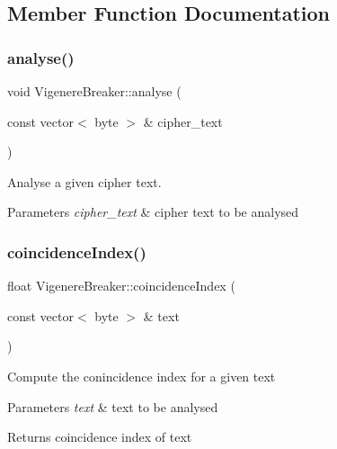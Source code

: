 \subsection{Member Function Documentation}
\mbox{\label{classVigenereBreaker_a6ba37c849739dcda0a06ed0596ae1bf5}} 
\subsubsection{\texorpdfstring{analyse()}{analyse()}}
{\footnotesize\ttfamily void Vigenere\+Breaker\+::analyse (\begin{DoxyParamCaption}\item[{const vector$<$ byte $>$ \&}]{cipher\+\_\+text }\end{DoxyParamCaption})}

Analyse a given cipher text. 
\begin{DoxyParams}{Parameters}
{\em cipher\+\_\+text} & cipher text to be analysed \\
\hline
\end{DoxyParams}
\mbox{\label{classVigenereBreaker_a9f3763cd550c2f97b09dc3c9e872ef4a}} 
\subsubsection{\texorpdfstring{coincidence\+Index()}{coincidenceIndex()}}
{\footnotesize\ttfamily float Vigenere\+Breaker\+::coincidence\+Index (\begin{DoxyParamCaption}\item[{const vector$<$ byte $>$ \&}]{text }\end{DoxyParamCaption})}

Compute the conincidence index for a given text


\begin{DoxyParams}{Parameters}
{\em text} & text to be analysed\\
\hline
\end{DoxyParams}
\begin{DoxyReturn}{Returns}
coincidence index of text 
\end{DoxyReturn}
\mbox{\label{classVigenereBreaker_a52abe1abb911197d3df281d33568e31a}} 
